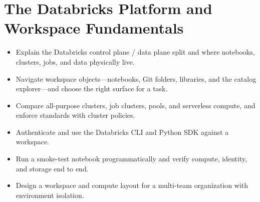 \chapter{The Databricks Platform and Workspace Fundamentals}
%
%
\begin{objectives}
\begin{itemize}
    \item Explain the Databricks control plane / data plane split and where notebooks, clusters, jobs, and data physically live.
    \item Navigate workspace objects---notebooks, Git folders, libraries, and the catalog explorer---and choose the right surface for a task.
    \item Compare all-purpose clusters, job clusters, pools, and serverless compute, and enforce standards with cluster policies.
    \item Authenticate and use the Databricks CLI and Python SDK against a workspace.
    \item Run a smoke-test notebook programmatically and verify compute, identity, and storage end to end.
    \item Design a workspace and compute layout for a multi-team organization with environment isolation.
\end{itemize}
\end{objectives}


